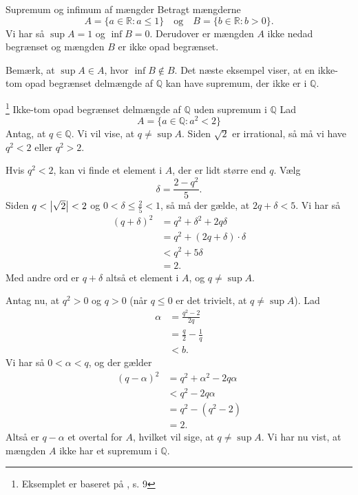 \begin{example}[label=exa:supinf]{Supremum og infimum af mængder}{}
  Betragt mængderne
  \[
  A=\{ a \in \mathbb{R}:a \leq 1 \}\quad \text{og} \quad B=\{ b \in \mathbb{R}: b>0 \}. 
  \] 
  Vi har så $\sup A=1$ og $\inf B=0$.
  Derudover er mængden $A$ ikke nedad begrænset og mængden $B$ er ikke opad begrænset. 
\end{example}

Bemærk, at $\sup A \in A$, hvor $\inf B \not\in B$.
Det næste eksempel viser, at en ikke-tom opad begrænset delmængde af $\mathbb{Q}$ kan have supremum, der ikke er i $\mathbb{Q}$. 

\begin{example}[label=exa:supQ]{\footnote{Eksemplet er baseret på \cite{Axler2024}, s. 9} Ikke-tom opad begrænset delmængde af $\mathbb{Q}$ uden supremum i $\mathbb{Q}$ }{}
  Lad
  \[
  A=\{ a \in \mathbb{Q}:a^2<2 \} 
  \] 
Antag, at $q \in \mathbb{Q}$.
Vi vil vise, at $q \neq \sup A$.
Siden $\sqrt{2} $ er irrational, så må vi have $q^2<2$ eller $q^2>2$. 

Hvis $q^2<2$, kan vi finde et element i $A$, der er lidt større end $q$.
Vælg
\[
  \delta=\frac{2-q^2}{5}.
\] 
Siden $q < \abs{\sqrt{2} }<2$ og $0<\delta \leq \frac{2}{5} <1$, så må der gælde, at $2q+\delta<5$. 
Vi har så 
\begin{equation*}
  \begin{split}
    \left(q + \delta \right)^2 &=q^2+\delta^2+2q \delta\\
    &=q^2+\left(2q+\delta \right) \cdot \delta \\
    &<q^2+5 \delta \\
    &=2.
  \end{split}
  \end{equation*}
  Med andre ord er $q + \delta $ altså et element i $A$, og $q \neq \sup A$.  

  Antag nu, at $q^2>0$ og $q>0$ (når $q \leq 0$ er det trivielt, at $q \neq \sup A$). 
  Lad 
  \begin{equation*}
  \begin{split}
   \alpha &=\frac{q^2-2}{2q}\\
  &=\frac{q}{2}-\frac{1}{q}\\
    &<b.
   \end{split}
  \end{equation*}
  Vi har så $0<\alpha <q$, og der gælder 
  \begin{equation*}
  \begin{split}
    \left(q-\alpha \right)^2&=q^2+\alpha ^2 - 2 q \alpha \\
    &<q^2-2q \alpha \\
    &=q^2-(q^2-2)\\
    &=2.
  \end{split}
  \end{equation*}
  Altså er $q- \alpha $ et overtal for $A$, hvilket vil sige, at $q \neq \sup A$. 
  Vi har nu vist, at mængden $A$ ikke har et supremum i $\mathbb{Q}$. 
\end{example}

